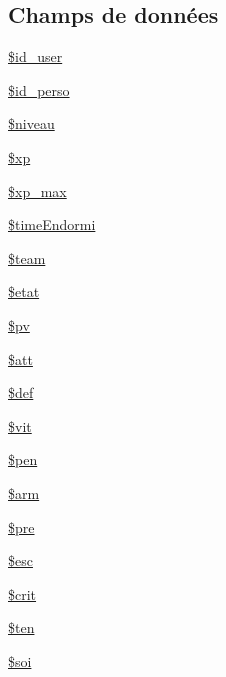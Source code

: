 \subsection*{Champs de données}
\begin{DoxyCompactItemize}
\item 
\mbox{\hyperlink{class_personnage_a707cfcc2c9cd6a344a406862339d11f8}{\$id\+\_\+user}}
\item 
\mbox{\hyperlink{class_personnage_a51a9f0c75c8c5638498e97abfa57b9f8}{\$id\+\_\+perso}}
\item 
\mbox{\hyperlink{class_personnage_a3b7142756b0726ddcfbdf15f25e73013}{\$niveau}}
\item 
\mbox{\hyperlink{class_personnage_a61c48e5d8e8f292eae5ee25bdece2ea5}{\$xp}}
\item 
\mbox{\hyperlink{class_personnage_a5db9df67ee8e4db9cd102cd1e3c16d66}{\$xp\+\_\+max}}
\item 
\mbox{\hyperlink{class_personnage_aa65967577dc96f51e7ac97ad693db6ba}{\$time\+Endormi}}
\item 
\mbox{\hyperlink{class_personnage_a6ad71afaee95c8a74314ed4dbde996fa}{\$team}}
\item 
\mbox{\hyperlink{class_personnage_a6bff6f7c83483c4a8a14ec15435789fb}{\$etat}}
\item 
\mbox{\hyperlink{class_personnage_a141c51268500c29e5d32388a715385c4}{\$pv}}
\item 
\mbox{\hyperlink{class_personnage_af656014aa0bcdb218dda521175b7ca7d}{\$att}}
\item 
\mbox{\hyperlink{class_personnage_a73553ab3389a0ae13b6fb74e95ffb678}{\$def}}
\item 
\mbox{\hyperlink{class_personnage_a0ea966627267856b8a91ddd9d8d8bbee}{\$vit}}
\item 
\mbox{\hyperlink{class_personnage_a0755ccfa96194e0b53a52145e064a6f4}{\$pen}}
\item 
\mbox{\hyperlink{class_personnage_a317df061881238833410018536fc7e89}{\$arm}}
\item 
\mbox{\hyperlink{class_personnage_a5c9dd55c9904cff076c586782ab9e4bc}{\$pre}}
\item 
\mbox{\hyperlink{class_personnage_aeb1f5caf10f25a71673d677ab3f93bfa}{\$esc}}
\item 
\mbox{\hyperlink{class_personnage_a4200ea4e8cf620cd02e67abd20bf4704}{\$crit}}
\item 
\mbox{\hyperlink{class_personnage_a8b582f85a6f349ca07ebf7bea833f2c0}{\$ten}}
\item 
\mbox{\hyperlink{class_personnage_af3cf1d157c89a87bc64735f8b67ea5e1}{\$soi}}

\end{DoxyCompactItemize}
